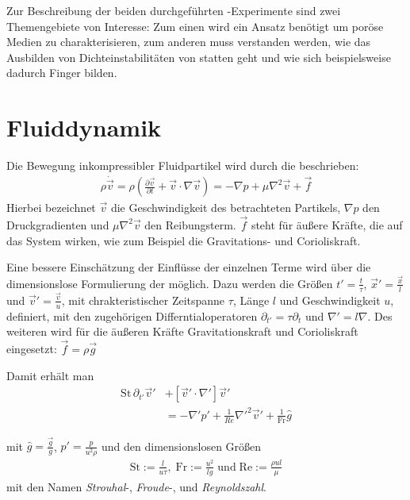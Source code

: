 \label{cha:theo}

Zur Beschreibung der beiden durchgeführten \HSCs-Experimente sind zwei Themengebiete von Interesse: Zum einen wird ein Ansatz benötigt um poröse Medien zu charakterisieren, zum anderen muss verstanden werden, wie das Ausbilden von Dichteinstabilitäten von statten geht und wie sich beispielsweise dadurch Finger bilden.


\section{Fluiddynamik}
\label{sec:hyd}
Die Bewegung inkompressibler Fluidpartikel wird durch die \NSG beschrieben:
\begin{eqnarray}
 \rho \dot{\vec{v}} = \rho \left( \frac{\partial \vec{v}}{\partial t} + \vec{v} \cdot \nabla \vec{v} \right) = - \nabla p + \mu \nabla^2 \vec{v} + \vec{f}
\end{eqnarray}
Hierbei bezeichnet $\vec{v}$ die Geschwindigkeit des betrachteten Partikels, $\nabla p$ den Druckgradienten und $\mu \nabla^2 \vec{v}$ den Reibungsterm. $\vec{f}$ steht für äußere Kräfte, die auf das System wirken, wie zum Beispiel die Gravitations- und Corioliskraft. \citep{roth2005}

Eine bessere Einschätzung der Einflüsse der einzelnen Terme wird über die dimensionslose Formulierung der \NSG möglich. Dazu werden die Größen $t' = \frac{t}{\tau}$,  $\vec{x}' = \frac{\vec{x}}{l}$ und $\vec{v}' = \frac{\vec{v}}{u}$, mit chrakteristischer Zeitspanne $\tau$, Länge $l$ und Geschwindigkeit $u$, definiert, mit den zugehörigen Differntialoperatoren $\partial_{t'} = \tau\partial_t$ und $\nabla' = l\nabla$. 
Des weiteren wird für die äußeren Kräfte Gravitationskraft und Corioliskraft eingesetzt: $\vec{f} = \rho\vec{g}$

Damit erhält man
\begin{equation}
\begin{aligned}
 \mathrm{St} \, \partial_{t'} \vec{v}' &+ \left[\vec{v}' \cdot \nabla' \right]\vec{v}' \\
 &= -\nabla'p' + \frac{1}{Re}\nabla'^2\vec{v}' + \frac{1}{\mathrm{Fr}}\hat{g}
\end{aligned}
\end{equation}

mit $\hat{g} = \frac{\vec{g}}{g}$, $p' = \frac{p}{u^2\rho}$ und den dimensionslosen Größen 
\begin{align}
 \mathrm{St} := \frac{l}{u\tau}, \; \mathrm{Fr} := \frac{u^2}{lg} \; \mathrm{und}  \; \mathrm{Re} := \frac{\rho u l}{\mu}
 \label{eq:Re}
\end{align}
 mit den Namen \textit{Strouhal}-, \textit{Froude}-, und \textit{Reynoldszahl}.

